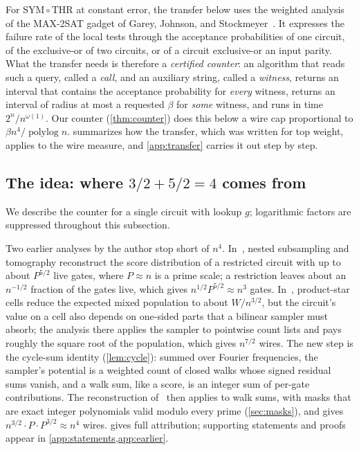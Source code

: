 \documentclass[11pt,letterpaper]{article}
\theoremstyle{definition}
\theoremstyle{remark}
\newcommand{\THR}{\mathrm{THR}}
\newcommand{\SYM}{\mathrm{SYM}}
\newcommand{\polylog}{\operatorname{polylog}}
\begin{document}
For \(\SYM\circ\THR\) at constant error, the transfer below uses
the weighted analysis~\cite[Section~11]{NagCG} of the MAX-2SAT gadget of
Garey, Johnson, and Stockmeyer~\cite{GJS76}.
It expresses the failure rate of the local tests through the acceptance probabilities
of one circuit, of the exclusive-or of two circuits, or of a circuit
exclusive-or an input parity. What the transfer needs is therefore a
\emph{certified counter}: an algorithm that reads such a query, called a \emph{call}, and an
auxiliary string, called a \emph{witness}, returns an interval that
contains the acceptance probability for \emph{every} witness, returns
an interval of radius at most a requested \(\beta\) for \emph{some}
witness, and runs in time \(2^n/n^{\omega(1)}\). Our counter
(\cref{thm:counter}) does this below a wire cap proportional to
\(\beta n^4/\polylog n\).  summarizes how the transfer, which was written for
top weight, applies to the wire measure, and \cref{app:transfer}
carries it out step by step.

\subsection{The idea: where \texorpdfstring{\(3/2+5/2=4\)}{3/2+5/2=4} comes from}
\label{sec:idea}



We describe the counter for a single circuit with lookup \(g\);
logarithmic factors are suppressed throughout this subsection.

\label{sec:new}
Two earlier analyses by the author stop short of \(n^4\).
In~\cite{NagCG}, nested subsampling and tomography reconstruct the
score distribution of a restricted circuit with up to about
\(P^{5/2}\) live gates, where \(P\approx n\) is a prime scale; a
restriction leaves about an \(n^{-1/2}\) fraction of the gates live,
which gives \(n^{1/2}P^{5/2}\approx n^3\) gates. In~\cite{Nag72},
product-star cells reduce the expected mixed population to about
\(W/n^{3/2}\), but the circuit's value on a cell also depends on
one-sided parts that a bilinear sampler must absorb; the analysis
there applies the sampler to pointwise count lists and pays roughly
the square root of the population, which gives \(n^{7/2}\) wires.
The new step is the cycle-sum identity (\cref{lem:cycle}): summed
over Fourier frequencies, the sampler's potential is a weighted count
of closed walks whose signed residual sums vanish, and a walk sum,
like a score, is an integer sum of per-gate contributions. The
reconstruction of~\cite{NagCG} then applies to walk sums, with masks
that are exact integer polynomials valid modulo every prime
(\cref{sec:masks}), and gives \(n^{3/2}\cdot P\cdot P^{3/2}\approx n^4\)
wires.  gives full attribution; supporting
statements and proofs appear in \cref{app:statements,app:earlier}.
\end{document}

